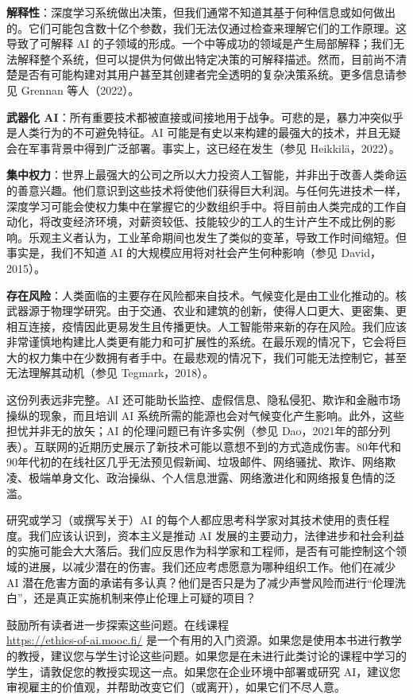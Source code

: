 \documentclass[lang=cn,newtx,10pt,scheme=chinese]{elegantbook}
\begin{document}
\textbf{解释性}：深度学习系统做出决策，但我们通常不知道其基于何种信息或如何做出的。它们可能包含数十亿个参数，我们无法仅通过检查来理解它们的工作原理。这导致了可解释 AI 的子领域的形成。一个中等成功的领域是产生局部解释；我们无法解释整个系统，但可以提供为何做出特定决策的可解释描述。然而，目前尚不清楚是否有可能构建对其用户甚至其创建者完全透明的复杂决策系统。更多信息请参见 Grennan 等人（2022）。


\textbf{武器化 AI}：所有重要技术都被直接或间接地用于战争。可悲的是，暴力冲突似乎是人类行为的不可避免特征。AI 可能是有史以来构建的最强大的技术，并且无疑会在军事背景中得到广泛部署。事实上，这已经在发生（参见 Heikkilä，2022）。


\textbf{集中权力}：世界上最强大的公司之所以大力投资人工智能，并非出于改善人类命运的善意兴趣。他们意识到这些技术将使他们获得巨大利润。与任何先进技术一样，深度学习可能会使权力集中在掌握它的少数组织手中。将目前由人类完成的工作自动化，将改变经济环境，对薪资较低、技能较少的工人的生计产生不成比例的影响。乐观主义者认为，工业革命期间也发生了类似的变革，导致工作时间缩短。但事实是，我们不知道 AI 的大规模应用将对社会产生何种影响（参见 David，2015）。


\textbf{存在风险}：人类面临的主要存在风险都来自技术。气候变化是由工业化推动的。核武器源于物理学研究。由于交通、农业和建筑的创新，使得人口更大、更密集、更相互连接，疫情因此更易发生且传播更快。人工智能带来新的存在风险。我们应该非常谨慎地构建比人类更有能力和可扩展性的系统。在最乐观的情况下，它会将巨大的权力集中在少数拥有者手中。在最悲观的情况下，我们可能无法控制它，甚至无法理解其动机（参见 Tegmark，2018）。

这份列表远非完整。AI 还可能助长监控、虚假信息、隐私侵犯、欺诈和金融市场操纵的现象，而且培训 AI 系统所需的能源也会对气候变化产生影响。此外，这些担忧并非无的放矢；AI 的伦理问题已有许多实例（参见 Dao，2021年的部分列表）。互联网的近期历史展示了新技术可能以意想不到的方式造成伤害。80年代和90年代初的在线社区几乎无法预见假新闻、垃圾邮件、网络骚扰、欺诈、网络欺凌、极端单身文化、政治操纵、个人信息泄露、网络激进化和网络报复色情的泛滥。

研究或学习（或撰写关于）AI 的每个人都应思考科学家对其技术使用的责任程度。我们应该认识到，资本主义是推动 AI 发展的主要动力，法律进步和社会利益的实施可能会大大落后。我们应反思作为科学家和工程师，是否有可能控制这个领域的进展，以减少潜在的伤害。我们还应考虑愿意为哪种组织工作。他们在减少 AI 潜在危害方面的承诺有多认真？他们是否只是为了减少声誉风险而进行“伦理洗白”，还是真正实施机制来停止伦理上可疑的项目？


鼓励所有读者进一步探索这些问题。在线课程 \\
\url{https://ethics-of-ai.mooc.fi/} 是一个有用的入门资源。如果您是使用本书进行教学的教授，建议您与学生讨论这些问题。如果您是在未进行此类讨论的课程中学习的学生，请敦促您的教授实现这一点。如果您在企业环境中部署或研究 AI，建议您审视雇主的价值观，并帮助改变它们（或离开），如果它们不尽人意。
\end{document}
